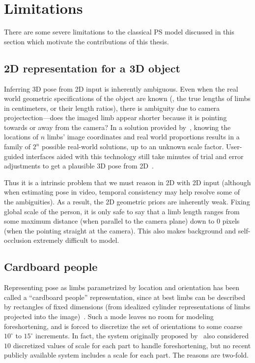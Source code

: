 \section{Limitations}
\label{sec:limitations}

There are some severe limitations to the classical PS model discussed in this 
section which motivate the contributions of this thesis. 

\subsection{2D representation for a 3D object} Inferring 3D pose from 2D input 
is inherently ambiguous.  Even when the real world geometric specifications of 
the object are known (\eg, the true lengths of limbs in centimeters, or their 
length ratios), there is ambiguity due to camera projectection---does the 
imaged limb appear shorter because it is pointing towards or away from the 
camera?  In a solution provided by~\citet{cj-skel}, knowing the locations of 
$n$ limbs' image coordinates and real world proportions results in a family of 
$2^n$ possible real-world solutions, up to an unknown scale factor.  
User-guided interfaces aided with this technology still take minutes of trial 
and error adjustments to get a plausible 3D pose from 2D~\citep{poselets}. 

Thus it is a intrinsic problem that we must reason in 2D with 2D input 
(although when estimating pose in video, temporal consistency may help resolve 
some of the ambiguities).  As a result, the 2D geometric priors are inherently 
weak.  Fixing global scale of the person, it is only safe to say that a limb 
length ranges from some maximum distance (when parallel to the camera plane) 
down to 0 pixels (when the pointing straight at the camera).  This also makes 
background and self-occlusion extremely difficult to model.

\subsection{Cardboard people}
Representing pose  as limbs parametrized by location and orientation has been 
called a ``cardboard people'' representation, since at best limbs can be 
described by rectangles of fixed dimensions (from idealized cylinder 
representations of limbs projected into the image)~\citep{cardboard}.  Such a 
mode  leaves no room for modeling foreshortening, and is forced to discretize 
the set of orientations to some coarse $10^\circ$ to $15^\circ$ increments.  In 
fact, the system originally proposed by~\citet{felz05} also considered $10$ 
discretized values of scale for each part to handle foreshortening, but no 
recent publicly available system 
\citep{andriluka09,eichner09,sapp2010,sapp2010cascades,sapp2011} includes a 
scale for each part. The reasons are two-fold. 

